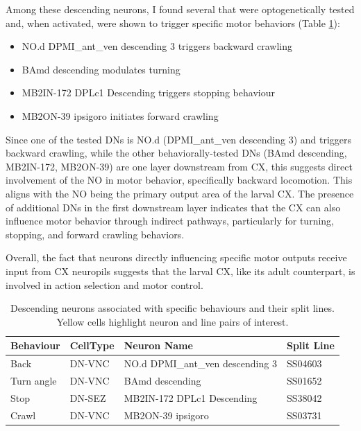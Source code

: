    Among these descending neurons, I found several that were optogenetically tested and, when activated, were shown to trigger specific motor behaviors (Table \ref{behaviourCXdescending}): 
    \begin{itemize}
        \item NO.d DPMI\_ant\_ven descending 3 triggers backward crawling
        \item BAmd descending modulates turning
        \item MB2IN-172 DPLc1 Descending triggers stopping behaviour
        \item MB2ON-39 ipsigoro initiates forward crawling
    \end{itemize}

    Since one of the tested DNs is NO.d (DPMI\_ant\_ven descending 3) and triggers backward crawling, while the other behaviorally-tested DNs (BAmd descending, MB2IN-172, MB2ON-39) are one layer downstream from CX, this suggests direct involvement of the NO in motor behavior, specifically backward locomotion. This aligns with the NO being the primary output area of the larval CX. The presence of additional DNs in the first downstream layer indicates that the CX can also influence motor behavior through indirect pathways, particularly for turning, stopping, and forward crawling behaviors.

    Overall, the fact that neurons directly influencing specific motor outputs receive input from CX neuropils suggests that the larval CX, like its adult counterpart, is involved in action selection and motor control.

    \begin{table}[H]
        \centering
        \begin{tabular}{l l p{} l}
            \toprule
            \textbf{Behaviour} & \textbf{CellType} & \textbf{Neuron Name} & \textbf{Split Line} \\
            \midrule
            Back & DN-VNC & \cellcolor{cxhl} NO.d DPMI\_ant\_ven descending 3 & \cellcolor{cxhl} SS04603 \\
            Turn angle & DN-VNC & \cellcolor{cxhl} BAmd descending & \cellcolor{cxhl} SS01652 \\
            Stop & DN-SEZ & \cellcolor{cxhl} MB2IN-172 DPLc1 Descending & \cellcolor{cxhl} SS38042 \\
            Crawl & DN-VNC & \cellcolor{cxhl} MB2ON-39 ipsigoro & \cellcolor{cxhl} SS03731 \\
            \bottomrule
        \end{tabular}
        \caption[Behaviour of CX Descending Neurons]{Descending neurons associated with specific behaviours and their split lines. Yellow cells highlight neuron and line pairs of interest.}
        \label{behaviourCXdescending}
    \end{table}


